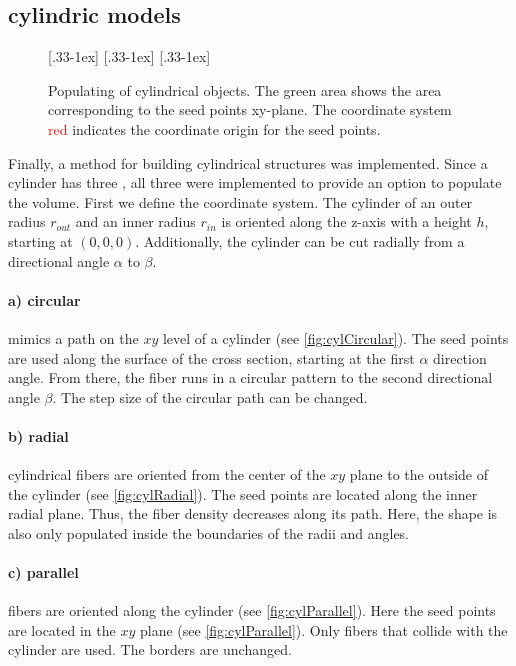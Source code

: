 \subsection{cylindric models}
% 
\begin{figure}[!t]
    \centering
    \setlength{\tikzwidth}{0.31\textwidth}
    [.33\textwidth-1ex]{
    }\hfill
    [.33\textwidth-1ex]{
    }\hfill
    [.33\textwidth-1ex]{
    }
	\caption{Populating of cylindrical objects. The green area shows the area corresponding to the seed points xy-plane. The coordinate system \textcolor{red}{red} indicates the coordinate origin for the seed points.}
\end{figure}
% 
Finally, a method for building cylindrical structures was implemented.
Since a cylinder has three , all three were implemented to provide an option to populate the volume.
First we define the coordinate system.
The cylinder of an outer radius $r_{\mathit{out}}$ and an inner radius $r_{\mathit{in}}$ is oriented along the z-axis with a height $h$, starting at $(0,0,0)$.
Additionally, the cylinder can be cut radially from a directional angle $\alpha$ to $\beta$.
% 
\paragraph{a) circular} mimics a path on the $xy$ level of a cylinder (see \cref{fig:cylCircular}).
The seed points are used along the surface of the cross section, starting at the first $\alpha$ direction angle.
From there, the fiber runs in a circular pattern to the second directional angle $\beta$.
The step size of the circular path can be changed.
% 
\paragraph{b) radial} cylindrical fibers are oriented from the center of the $xy$ plane to the outside of the cylinder (see \cref{fig:cylRadial}).
The seed points are located along the inner radial plane.
Thus, the fiber density decreases along its path.
Here, the shape is also only populated inside the boundaries of the radii and angles.
% 
\paragraph{c) parallel} fibers are oriented along the cylinder (see \cref{fig:cylParallel}).
Here the seed points are located in the $xy$ plane (see \cref{fig:cylParallel}). Only fibers that collide with the cylinder are used. The borders are unchanged.
% 
% 
% 
